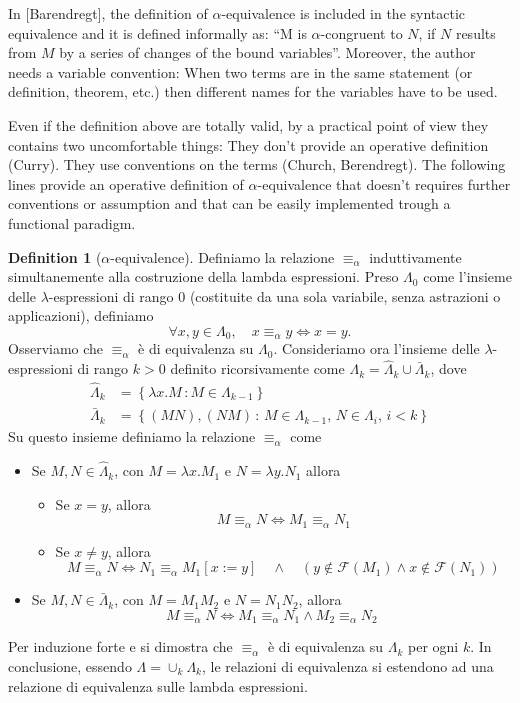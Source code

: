 \documentclass[a4paper,11pt]{article}
\theoremstyle{definition}
\newtheorem{defn}{Definition}
\newcommand{\FF}{\mathcal{F}}
\begin{document}
In [Barendregt], the definition of $\alpha$-equivalence is included in the
syntactic equivalence and it is defined informally as: ``M is
$\alpha$-congruent to $N$, if $N$ results from $M$ by a series of changes of
the bound variables''. Moreover, the author needs a variable convention: 
When two terms are in the same statement (or definition,
theorem, etc.) then different names for the variables have to be used.

Even if the definition above are totally valid, by a practical point of view
they contains two uncomfortable things: They don't provide an
operative definition (Curry). They use conventions on the terms (Church,
Berendregt). The following lines provide an operative definition of
$\alpha$-equivalence that doesn't requires further conventions or assumption
and that can be easily implemented trough a functional paradigm.

\begin{defn}[$\alpha$-equivalence]
  Definiamo la relazione $\equiv_\alpha$ induttivamente simultanemente alla costruzione
  della lambda espressioni.
  Preso $\Lambda_0$ come l'insieme delle $\lambda$-espressioni di rango $0$
  (costituite da una sola variabile, senza astrazioni o applicazioni), definiamo
  \[
    \forall x,y \in \Lambda_0,\quad x\equiv_\alpha y\iff x=y.
  \]
  Osserviamo che $\equiv_\alpha$ è di equivalenza su $\Lambda_0$.
  Consideriamo ora l'insieme delle $\lambda$-espressioni di rango $k>0$
  definito ricorsivamente come $\Lambda_k=\hat \Lambda_k\cup \bar \Lambda_k$,
  dove
  \[
    \begin{aligned}
      \hat \Lambda_k &=\left\{ \lambda
      x.M\,:M\in\Lambda_{k-1}\right\}\\
      \bar \Lambda_k&=\left\{ (MN), (NM)\,:\, M\in\Lambda_{k-1},\,N\in\Lambda_i,\,i<k \right\}
    \end{aligned}
  \]
  Su questo insieme definiamo la relazione $\equiv_\alpha$ come
  \begin{itemize}
    \item Se $M,N\in\hat\Lambda_{k}$, con $M=\lambda x.M_1$ e $N=\lambda y.N_1$
      allora
      \begin{itemize}
        \item Se $x=y$, allora
          \[
            M\equiv_\alpha N \iff M_1\equiv_\alpha N_1
          \]
        \item Se $x\ne y$, allora
          \[
            M\equiv_\alpha N \iff N_1\equiv_\alpha M_1[x:=y]\quad\wedge\quad
            (y\not\in\FF(M_1) \wedge x\not\in\FF(N_1))
          \]
      \end{itemize}
    \item Se $M,N\in\bar\Lambda_k$, con $M=M_1M_2$ e $N=N_1N_2$, allora
      \[
        M\equiv_\alpha N \iff M_1\equiv_\alpha N_1\wedge M_2\equiv_\alpha N_2
      \]
  \end{itemize}
  Per induzione forte e  si dimostra che $\equiv_\alpha$ è di equivalenza
  su $\Lambda_k$ per ogni $k$. In conclusione, essendo $\Lambda=\cup_k \Lambda_k$, 
  le relazioni di equivalenza si estendono ad una relazione di equivalenza 
  sulle lambda espressioni.
\end{defn}
\end{document}
